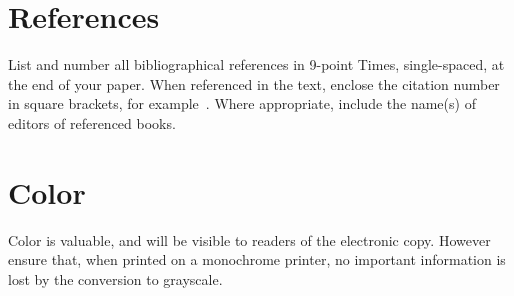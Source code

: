 \documentclass[extendedabs]{recpad2k}
\begin{document}
\section{References}

List and number all bibliographical references in 9-point Times,
single-spaced, at the end of your paper. When referenced in the text,
enclose the citation number in square brackets, for
example~\cite{Authors06}.  Where appropriate, include the name(s) of
editors of referenced books.


\section{Color}

Color is valuable, and will be visible to readers of the electronic copy.
However ensure that, when printed on a monochrome printer, no important
information is lost by the conversion to grayscale.


\end{document}
